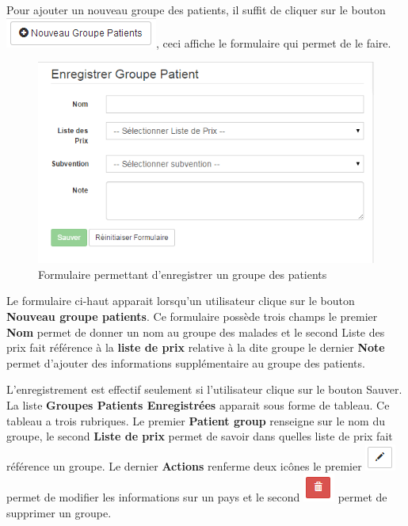 \documentclass[12pt,a4paper]{report}
\begin{document}
Pour ajouter un nouveau groupe des patients, il suffit de cliquer sur le bouton \includegraphics[scale=0.7]{pic/NewGroupPatient.png}, ceci affiche le formulaire qui permet de le faire.

\begin{figure}[h]
\begin{center}
\includegraphics[width=14cm]{pic/FormGroupPatient.png}
\end{center}
\caption{Formulaire permettant d'enregistrer un groupe des patients}
\label{Formulaire permettant d'enregistrer un groupe des patients}
\end{figure}

Le formulaire ci-haut apparait lorsqu'un utilisateur clique sur le bouton \textbf{Nouveau groupe patients}. Ce formulaire possède trois champs le premier \textbf{Nom} permet de donner un nom au groupe des malades et le second Liste des prix fait référence à la \textbf{liste de prix} relative à la dite groupe le dernier \textbf{Note} permet d'ajouter des informations supplémentaire au groupe des patients.

L'enregistrement est effectif seulement si l'utilisateur clique sur le bouton Sauver. La liste \textbf{Groupes Patients Enregistrées} apparait sous forme de tableau. Ce tableau a trois rubriques. Le premier \textbf{Patient group} renseigne sur le nom du groupe, le second \textbf{Liste de prix} permet de savoir dans quelles liste de prix fait référence un groupe. Le dernier \textbf{Actions} renferme deux icônes le premier \includegraphics[scale=0.7]{pic/EditBlack.png}  permet de modifier les informations sur un pays et le second \includegraphics[scale=0.7]{pic/DeleteRed.png}  permet de supprimer un groupe.
\end{document}

